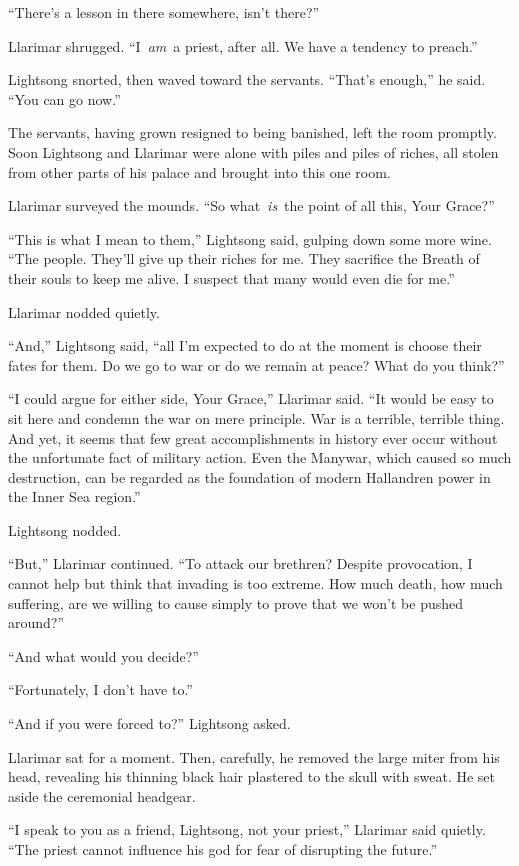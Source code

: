 “There’s a lesson in there somewhere, isn’t there?”

Llarimar shrugged. “I~\textit{am}~a priest, after all. We have a tendency to preach.”

Lightsong snorted, then waved toward the servants. “That’s enough,” he said. “You can go now.”

The servants, having grown resigned to being banished, left the room promptly. Soon Lightsong and Llarimar were alone with piles and piles of riches, all stolen from other parts of his palace and brought into this one room.

Llarimar surveyed the mounds. “So what~\textit{is}~the point of all this, Your Grace?”

“This is what I mean to them,” Lightsong said, gulping down some more wine. “The people. They’ll give up their riches for me. They sacrifice the Breath of their souls to keep me alive. I suspect that many would even die for me.”

Llarimar nodded quietly.

“And,” Lightsong said, “all I’m expected to do at the moment is choose their fates for them. Do we go to war or do we remain at peace? What do you think?”

“I could argue for either side, Your Grace,” Llarimar said. “It would be easy to sit here and condemn the war on mere principle. War is a terrible, terrible thing. And yet, it seems that few great accomplishments in history ever occur without the unfortunate fact of military action. Even the Manywar, which caused so much destruction, can be regarded as the foundation of modern Hallandren power in the Inner Sea region.”

Lightsong nodded.

“But,” Llarimar continued. “To attack our brethren? Despite provocation, I cannot help but think that invading is too extreme. How much death, how much suffering, are we willing to cause simply to prove that we won’t be pushed around?”

“And what would you decide?”

“Fortunately, I don’t have to.”

“And if you were forced to?” Lightsong asked.

Llarimar sat for a moment. Then, carefully, he removed the large miter from his head, revealing his thinning black hair plastered to the skull with sweat. He set aside the ceremonial headgear.

“I speak to you as a friend, Lightsong, not your priest,” Llarimar said quietly. “The priest cannot influence his god for fear of disrupting the future.”

